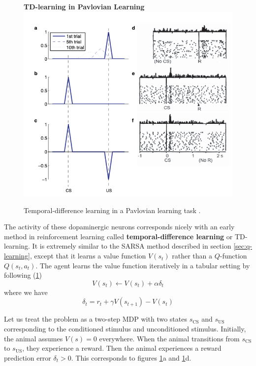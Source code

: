 \documentclass[journal, onecolumn, 12pt, draftclsnofoot]{IEEEtran}
\newcommand{\kword}[1]{\textbf{#1}}
\begin{document}
		\begin{figure}[ht]
			\begin{center}
				\textbf{TD-learning in Pavlovian Learning} \\
			\includegraphics[scale=0.6]{fig/Pavlovian-learning.png}
		\end{center}
			\caption{Temporal-difference learning in a Pavlovian learning task \cite{brain}.}
			\label{fig:td-learning-dopamine}
		\end{figure}
		\par The activity of these dopaminergic neurons corresponds nicely with an early method in reinforcement learning called \kword{temporal-difference learning} or TD-learning. It is extremely similar to the SARSA method described in section \ref{sec:q-learning}, except that it learns a value function $V(s_t)$ rather than a $Q$-function $Q(s_t, a_t)$. The agent learns the value function iteratively in a tabular setting by following (\ref{fig:td-learning-dopamine})
		\begin{equation}
			\label{eqn:td-learning}
			V(s_t) \gets V(s_t) + \alpha \delta_t
		\end{equation}
		where we have
		\begin{equation*}
			\delta_t = r_t + \gamma V(s_{t+1}) - V(s_t)
		\end{equation*}
		\par Let us treat the problem as a two-step MDP with two states $s_{\text{CS}}$ and $s_{\text{US}}$ corresponding to the conditioned stimulus and unconditioned stimulus. Initially, the animal assumes $V(s) = 0$ everywhere. When the animal transitions from $s_{\text{CS}}$ to $s_{\text{US}}$, they experience a reward. Then the animal experiences a reward prediction error $\delta_t > 0$. This corresponds to figures \ref{fig:td-learning-dopamine}a and \ref{fig:td-learning-dopamine}d.
\end{document}
